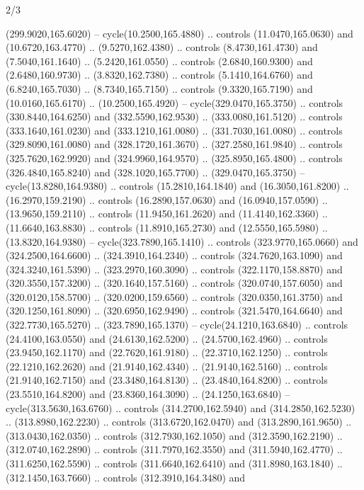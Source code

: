 \begin{flagdescription}{2/3}
\begin{scope}[xshift=0.5\flaglength,yshift=0.5\flagwidth,scale=\stretchfactor]
\begin{scope}[scale=0.001645\flagwidth,yshift=65mm,xshift=-63mm]
\begin{scope}[y=0.80pt, x=0.80pt, yscale=-1,]
\begin{scope}[cm={{1.33333,0.0,0.0,1.33333,(0.0,1e-05)}}]
  (299.9020,165.6020) -- cycle(10.2500,165.4880) .. controls (11.0470,165.0630)
  and (10.6720,163.4770) .. (9.5270,162.4380) .. controls (8.4730,161.4730) and
  (7.5040,161.1640) .. (5.2420,161.0550) .. controls (2.6840,160.9300) and
  (2.6480,160.9730) .. (3.8320,162.7380) .. controls (5.1410,164.6760) and
  (6.8240,165.7030) .. (8.7340,165.7150) .. controls (9.3320,165.7190) and
  (10.0160,165.6170) .. (10.2500,165.4920) -- cycle(329.0470,165.3750) ..
  controls (330.8440,164.6250) and (332.5590,162.9530) .. (333.0080,161.5120) ..
  controls (333.1640,161.0230) and (333.1210,161.0080) .. (331.7030,161.0080) ..
  controls (329.8090,161.0080) and (328.1720,161.3670) .. (327.2580,161.9840) ..
  controls (325.7620,162.9920) and (324.9960,164.9570) .. (325.8950,165.4800) ..
  controls (326.4840,165.8240) and (328.1020,165.7700) .. (329.0470,165.3750) --
  cycle(13.8280,164.9380) .. controls (15.2810,164.1840) and (16.3050,161.8200)
  .. (16.2970,159.2190) .. controls (16.2890,157.0630) and (16.0940,157.0590) ..
  (13.9650,159.2110) .. controls (11.9450,161.2620) and (11.4140,162.3360) ..
  (11.6640,163.8830) .. controls (11.8910,165.2730) and (12.5550,165.5980) ..
  (13.8320,164.9380) -- cycle(323.7890,165.1410) .. controls (323.9770,165.0660)
  and (324.2500,164.6600) .. (324.3910,164.2340) .. controls (324.7620,163.1090)
  and (324.3240,161.5390) .. (323.2970,160.3090) .. controls (322.1170,158.8870)
  and (320.3550,157.3200) .. (320.1640,157.5160) .. controls (320.0740,157.6050)
  and (320.0120,158.5700) .. (320.0200,159.6560) .. controls (320.0350,161.3750)
  and (320.1250,161.8090) .. (320.6950,162.9490) .. controls (321.5470,164.6640)
  and (322.7730,165.5270) .. (323.7890,165.1370) -- cycle(24.1210,163.6840) ..
  controls (24.4100,163.0550) and (24.6130,162.5200) .. (24.5700,162.4960) ..
  controls (23.9450,162.1170) and (22.7620,161.9180) .. (22.3710,162.1250) ..
  controls (22.1210,162.2620) and (21.9140,162.4340) .. (21.9140,162.5160) ..
  controls (21.9140,162.7150) and (23.3480,164.8130) .. (23.4840,164.8200) ..
  controls (23.5510,164.8200) and (23.8360,164.3090) .. (24.1250,163.6840) --
  cycle(313.5630,163.6760) .. controls (314.2700,162.5940) and
  (314.2850,162.5230) .. (313.8980,162.2230) .. controls (313.6720,162.0470) and
  (313.2890,161.9650) .. (313.0430,162.0350) .. controls (312.7930,162.1050) and
  (312.3590,162.2190) .. (312.0740,162.2890) .. controls (311.7970,162.3550) and
  (311.5940,162.4770) .. (311.6250,162.5590) .. controls (311.6640,162.6410) and
  (311.8980,163.1840) .. (312.1450,163.7660) .. controls (312.3910,164.3480) and

\end{scope}
\end{scope}
\end{scope}
\end{scope}
\end{flagdescription}
